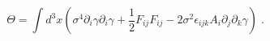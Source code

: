 \begin{equation}
\Theta =\int d^{3}x\left( \sigma ^{4}\partial _{i}\gamma \partial _{i}\gamma
+\frac{1}{2}F_{ij}F_{ij}-2\sigma ^{2}\epsilon _{ijk}A_{i}\partial
_{j}\partial _{k}\gamma \right) \;.  \label{thex}
\end{equation}

